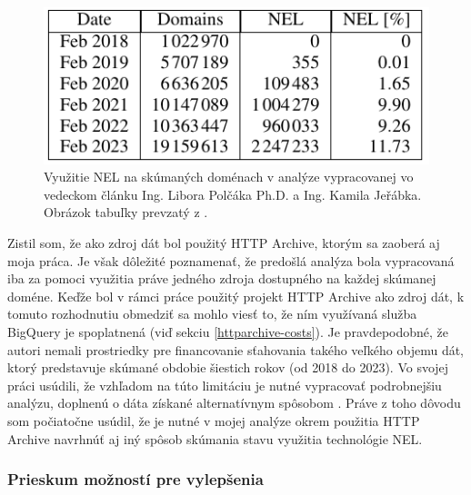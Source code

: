 \begin{figure}[!htb]
\begin{center}
    \includegraphics[width=0.55\linewidth]{obrazky-figures/polcak-analysis-hd.pdf}
    \caption{Využitie NEL na skúmaných doménach v analýze vypracovanej vo vedeckom článku Ing. Libora Polčáka Ph.D. a Ing. Kamila Jeřábka. Obrázok tabuľky prevzatý z \cite{nel-http-archive}.}
    \label{fig:polcak-analysis}
\end{center}
\end{figure}

\pagebreak

Zistil som, že ako zdroj dát bol použitý HTTP Archive, ktorým sa zaoberá aj moja práca.
Je však dôležité poznamenať, že predošlá analýza bola vypracovaná iba za pomoci využitia 
práve jedného zdroja dostupného na každej skúmanej doméne.
Keďže bol v rámci práce použitý projekt HTTP Archive ako zdroj dát, k tomuto rozhodnutiu obmedziť sa mohlo viesť to, 
že ním využívaná služba BigQuery je spoplatnená (viď sekciu \ref{httparchive-costs}). 
Je pravdepodobné, že autori nemali prostriedky pre financovanie sťahovania takého veľkého objemu dát, 
ktorý predstavuje skúmané obdobie šiestich rokov (od 2018 do 2023).
Vo svojej práci usúdili, že vzhľadom na túto limitáciu je nutné vypracovať podrobnejšiu analýzu, 
doplnenú o dáta získané alternatívnym spôsobom \cite{nel-http-archive}.
Práve z toho dôvodu som počiatočne usúdil, že je nutné v mojej analýze okrem použitia HTTP Archive navrhnúť 
aj iný spôsob skúmania stavu využitia technológie NEL.

\subsubsection{Prieskum možností pre vylepšenia}

